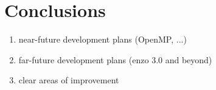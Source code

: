 
\section{Conclusions}

\begin{enumerate}
\item near-future development plans (OpenMP, ...)
\item far-future development plans (enzo 3.0 and beyond)
\item clear areas of improvement
\end{enumerate}
 